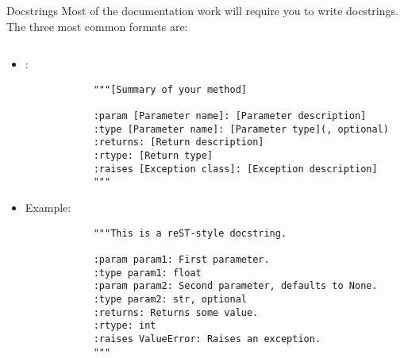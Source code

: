 \begin{frame}[fragile]{Docstrings}
  Most of the documentation work will require you to write docstrings. The three most common
  formats are:
  \begin{columns}[t, onlytextwidth]
    \begin{column}{0.78\textwidth}
      \begin{itemize}
        \item<1-2> \reST:
          \begin{verbatim}
            """[Summary of your method]

            :param [Parameter name]: [Parameter description]
            :type [Parameter name]: [Parameter type](, optional)
            :returns: [Return description]
            :rtype: [Return type]
            :raises [Exception class]: [Exception description]
            """
          \end{verbatim}

        \item<2> Example:
          \begin{verbatim}
            """This is a reST-style docstring.

            :param param1: First parameter.
            :type param1: float
            :param param2: Second parameter, defaults to None.
            :type param2: str, optional
            :returns: Returns some value.
            :rtype: int
            :raises ValueError: Raises an exception.
            """
          \end{verbatim}
      \end{itemize}
    \end{column}
    \hfill
    \begin{column}{0.2\textwidth}
    \end{column}
  \end{columns}
\end{frame}

